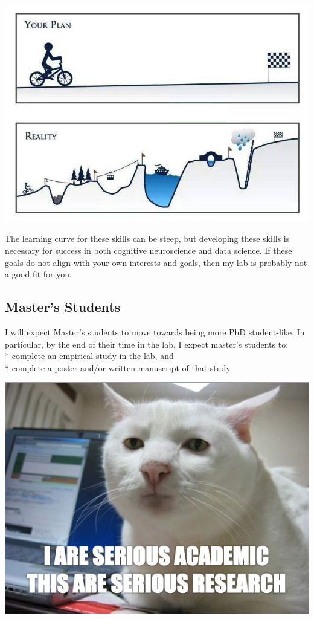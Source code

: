 \documentclass[]{book}
\begin{document}
\includegraphics{images/phdplan.jpg}

The learning curve for these skills can be steep, but developing these skills is necessary for success in both cognitive neuroscience and data science. If these goals do not align with your own interests and goals, then my lab is probably not a good fit for you.

\hypertarget{masters-students}{%
\subsection{Master's Students}\label{masters-students}}

I will expect Master's students to move towards being more PhD student-like. In particular, by the end of their time in the lab, I expect master's students to:\\
* complete an empirical study in the lab, and\\
* complete a poster and/or written manuscript of that study.

\includegraphics{images/researchcat.jpg}
\end{document}
